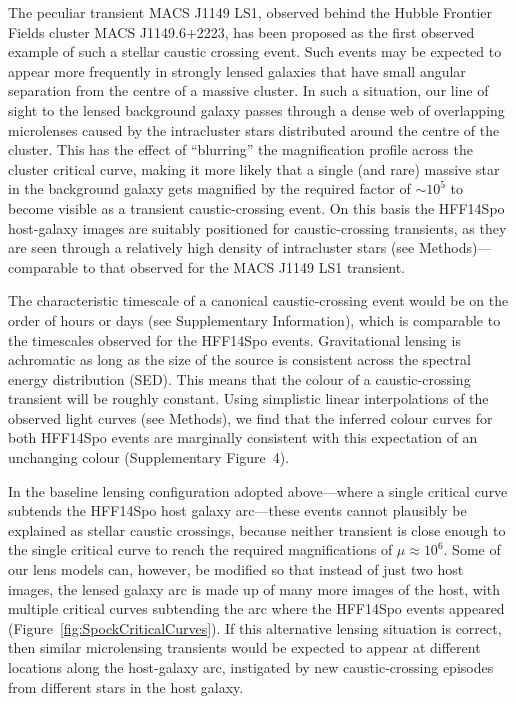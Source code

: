 \documentclass{article}
\def\spock{HFF14Spo\xspace}
\begin{document}
The peculiar transient MACS J1149 LS1, observed behind the Hubble
Frontier Fields cluster MACS J1149.6+2223, has been proposed as the
first observed example of such a stellar caustic crossing
event\cite{Kelly:2017}. Such events may be expected to appear more
frequently in strongly lensed galaxies that have small angular
separation from the centre of a massive cluster. In such a situation,
our line of sight to the lensed background galaxy passes through a
dense web of overlapping microlenses caused by the intracluster stars
distributed around the centre of the cluster. This has the effect of
``blurring'' the magnification profile across the cluster critical
curve, making it more likely that a single (and rare) massive star in
the background galaxy gets magnified by the required factor of
$\sim10^5$ to become visible as a transient caustic-crossing event.
On this basis the \spock host-galaxy images are suitably positioned
for caustic-crossing transients, as they are seen through a relatively
high density of intracluster stars (see Methods)---comparable to that
observed for the MACS J1149 LS1 transient.

The characteristic timescale of a canonical caustic-crossing event
would be on the order of hours or days (see Supplementary
Information), which is comparable to the timescales observed for the
\spock events. Gravitational lensing is achromatic as long as the size
of the source is consistent across the spectral energy distribution
(SED).  This means that the colour of a caustic-crossing transient will
be roughly constant.  Using simplistic linear interpolations of the
observed light curves (see Methods), we find that the inferred colour
curves for both \spock events are marginally consistent with this
expectation of an unchanging colour (Supplementary
Figure~4).

In the baseline lensing configuration adopted above---where a single
critical curve subtends the \spock host galaxy arc---these events
cannot plausibly be explained as stellar caustic crossings, because
neither transient is close enough to the single critical curve to
reach the required magnifications of $\mu\approx10^6$.  Some of our lens
models can, however, be modified so that instead of just two host
images, the lensed galaxy arc is made up of many more images of the
host, with multiple critical curves subtending the arc where the
\spock events appeared (Figure~\ref{fig:SpockCriticalCurves}).
If this alternative lensing
situation is correct, then similar microlensing transients would be
expected to appear at different locations along the host-galaxy arc,
instigated by new caustic-crossing episodes from different stars in
the host galaxy.
\end{document}
